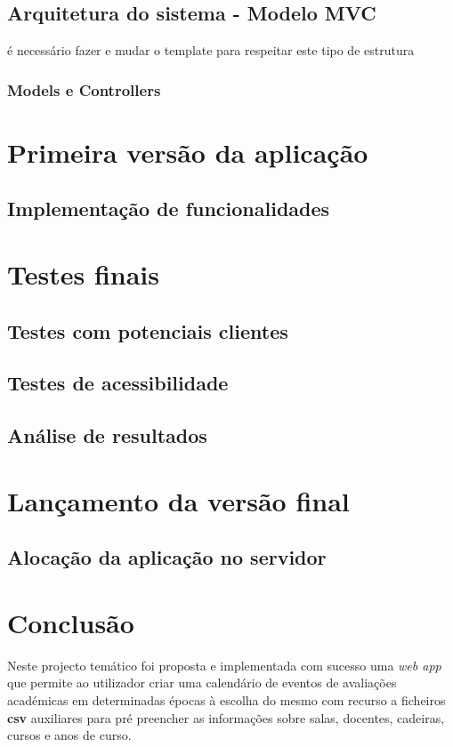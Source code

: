 \documentclass[11pt, twoside]{report}
\begin{document}
	\section{Arquitetura do sistema - Modelo MVC}
	é necessário fazer e mudar o template para respeitar este tipo de estrutura
	\subsection{Models e Controllers}
	
	\chapter{Primeira versão da aplicação}
	\section{Implementação de funcionalidades}
	
	\chapter{Testes finais}
	\section{Testes com potenciais clientes}
	\section{Testes de acessibilidade}
	\section{Análise de resultados}
	
	\chapter{Lançamento da versão final}
	\section{Alocação da aplicação no servidor}
	
	
	\chapter{Conclusão}
	
	Neste projecto temático foi proposta e implementada com sucesso uma \textit{web app} que permite ao utilizador criar uma calendário de eventos de avaliações académicas em determinadas épocas à escolha do mesmo com recurso a ficheiros \textbf{csv} auxiliares para pré preencher as informações sobre salas, docentes, cadeiras, cursos e anos de curso.
	
\end{document}
